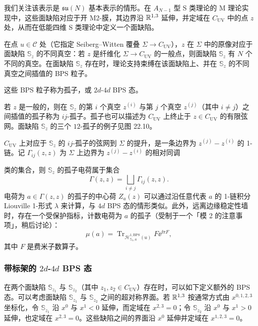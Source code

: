 我们关注该表示是 $\mathfrak{su}(N)$ 基本表示的情形。在 $A_{N-1}$ 型 S 类理论的 M 理论实现中，这些面缺陷对应于开 M2-膜，其边界沿 $\mathbb{R}^{1,3}$ 延伸，并定域在 $C_{\mathrm{UV}}$ 中的点 $z$ 处，从而在低能四维 S 类理论中定义一个面缺陷。

在点 $u\in\mathcal{C}$ 处（它指定 Seiberg–Witten 覆叠 $\Sigma\to C_{\mathrm{UV}}$），$z$ 在 $\Sigma$ 中的原像对应于面缺陷 $\mathbb{S}_z$ 的不同真空：若 $z$ 是纤维化 $\Sigma\to C_{\mathrm{UV}}$ 的一般点，则面缺陷 $\mathbb{S}_z$ 有 $N$ 个不同的真空。在面缺陷 $\mathbb{S}_z$ 存在时，理论支持束缚在该面缺陷上、并在 $\mathbb{S}_z$ 的不同真空之间插值的 BPS 粒子。

\begin{definition}[22.17]
这些 BPS 粒子称为孤子，或 $2d$-$4d$ BPS 态。
\end{definition}

若 $z$ 是一般的，则在 $\mathbb{S}_z$ 的第 $i$ 个真空 $z^{(i)}$ 与第 $j$ 个真空 $z^{(j)}$（其中 $i\ne j$）之间插值的孤子称为 $ij$-孤子。孤子也可以描述为 $C_{\mathrm{UV}}$ 上终止于 $z\in C_{\mathrm{UV}}$ 的有限弦网。面缺陷 $\mathbb{S}_z$ 的三个 $12$-孤子的例子见图 22.10。

$C_{\mathrm{UV}}$ 上对应于 $\mathbb{S}_z$ 的 $ij$-孤子的弦网到 $\Sigma$ 的提升，是一条边界为 $z^{(j)}-z^{(i)}$ 的 1-链。记 $\Gamma_{ij}(z,z)$ 为 $\Sigma$ 上边界为 $z^{(j)}-z^{(i)}$ 的相对同调

类的集合，则 $\mathbb{S}_z$ 的孤子电荷属于集合
\[
\Gamma(z,z)=\bigsqcup_{i\ne j}\Gamma_{ij}(z,z).
\]
电荷为 $a\in\Gamma(z,z)$ 的孤子的中心荷 $Z_a(z)$ 可以通过沿任意代表 $a$ 的 1-链积分 Liouville 1-形式 $\lambda$ 来计算，与 $4d$ BPS 态的情形类似。此外，远离边缘稳定性墙时，存在一个受保护指标，计数电荷为 $a$ 的孤子（受制于一个「模 2 的注意事项」，稍后讨论）：
\begin{equation}
\mu(a)=\operatorname{Tr}_{\mathcal{H}^{1,\mathrm{BPS}}_{\mathbb{S}_z,a}(u)}F\ee^{\ii\pi F},\tag{22.11}
\end{equation}
其中 $F$ 是费米子数算子。


\subsubsection*{带标架的 $2d$-$4d$ BPS 态}

在两个面缺陷 $\mathbb{S}_{z_1}$ 与 $\mathbb{S}_{z_2}$（其中 $z_1,z_2\in C_{\mathrm{UV}}$）存在时，可以如下定义额外的 BPS 态。可以考虑面缺陷 $\mathbb{S}_{z_1}$ 与 $\mathbb{S}_{z_2}$ 之间的超对称界面。若 $\mathbb{R}^{1,3}$ 按通常方式由 $x^{0,1,2,3}$ 坐标化，令 $\mathbb{S}_{z_1}$ 沿 $x^0$ 与 $x^1<0$ 延伸，而定域在 $x^{2,3}=0$；令 $\mathbb{S}_{z_2}$ 沿 $x^0$ 与 $x^1>0$ 延伸，也定域在 $x^{2,3}=0$。这些缺陷之间的界面沿 $x^0$ 延伸并定域在 $x^{1,2,3}=0$。

